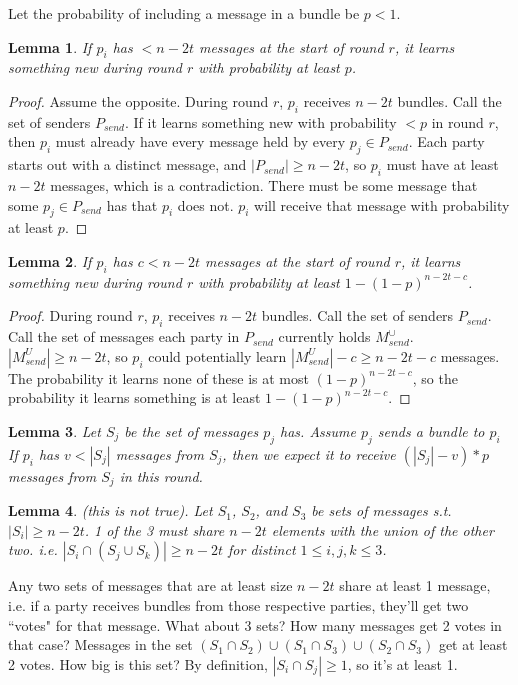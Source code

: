 \documentclass{article}
\newtheorem{lemma}{Lemma}
\begin{document}
Let the probability of including a message in a bundle be $p < 1$.
\begin{lemma}
If $p_i$ has $< n - 2t$ messages at the start of round $r$, it learns something new during round $r$ with probability at least $p$.
\end{lemma}
\begin{proof}
Assume the opposite. During round $r$, $p_i$ receives $n - 2t$ bundles. Call the set of senders $P_{send}$. If it learns something new with probability $< p$ in round $r$, then $p_i$ must already have every message held by every $p_j \in P_{send}$. Each party starts out with a distinct message, and $|P_{send}| \geq n - 2t$, so $p_i$ must have at least $n -2t$ messages, which is a contradiction. There must be some message that some $p_j \in P_{send}$ has that $p_i$ does not. $p_i$ will receive that message with probability at least $p$.
\end{proof}
\begin{lemma}
If $p_i$ has $c < n - 2t$ messages at the start of round $r$, it learns something new during round $r$ with probability at least $1 - (1 - p)^{n - 2t - c}$.
\end{lemma}
\begin{proof}
During round $r$, $p_i$ receives $n - 2t$ bundles. Call the set of senders $P_{send}$. Call the set of messages each party in $P_{send}$ currently holds $M_{send}^\cup$. $|M^U_{send}| \geq n - 2t$, so $p_i$ could potentially learn $|M^U_{send}| - c \geq n - 2t - c$ messages. The probability it learns none of these is at most $(1 - p)^{n - 2t - c}$, so the probability it learns something is at least $1 - (1 - p)^{n - 2t - c}$.
\end{proof}

\begin{lemma}
Let $S_j$ be the set of messages $p_j$ has. Assume $p_j$ sends a bundle to $p_i$ If $p_i$ has $v < |S_j|$ messages from $S_j$, then we expect it to receive $(|S_j| - v) * p$ messages from $S_j$ in this round.
\end{lemma}

\begin{lemma}
(this is not true). Let $S_1$, $S_2$, and $S_3$ be sets of messages s.t. $|S_i| \geq n - 2t$. 1 of the 3 must share $n - 2t$ elements with the union of the other two. i.e. $|S_i \cap (S_j \cup S_k)| \geq n - 2t$ for distinct $1 \leq i, j, k \leq 3$.
\end{lemma}

Any two sets of messages that are at least size $n - 2t$ share at least 1 message, i.e. if a party receives bundles from those respective parties, they'll get two ``votes" for that message. What about 3 sets? How many messages get 2 votes in that case? Messages in the set $(S_1 \cap S_2) \cup (S_1 \cap S_3) \cup (S_2 \cap S_3)$ get at least 2 votes. How big is this set? By definition, $|S_i \cap S_j| \geq 1$, so it's at least 1. 




\end{document}
